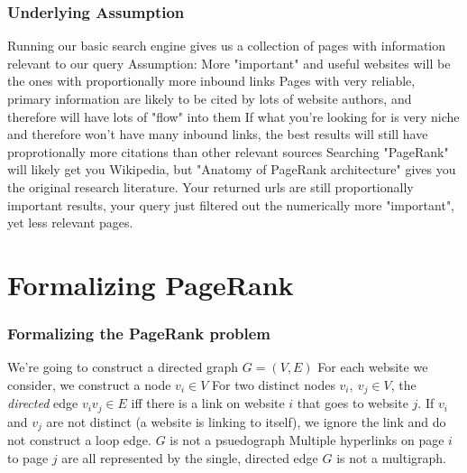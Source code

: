 \documentclass{beamer}
\begin{document}
\begin{frame}[t]
\frametitle{Underlying Assumption}    
\begin{outline}
    \1 Running our basic search engine gives us a collection of pages with information relevant to our query
    \1 Assumption: More "important" and useful websites will be the ones with proportionally more inbound links
    \1 Pages with very reliable, primary information are likely to be cited by lots of website authors, and therefore will have lots of "flow" into them
    \1 If what you're looking for is very niche and therefore won't have many inbound links, the best results will still have proprotionally more citations than other relevant sources
    \1 Searching "PageRank" will likely get you Wikipedia, but "Anatomy of PageRank architecture" gives you the original research literature. Your returned urls are still proportionally important results, your query just filtered out the numerically more "important", yet less relevant pages.
\end{outline}
\end{frame}

\section{Formalizing PageRank}
\begin{frame}[t]
\frametitle{Formalizing the PageRank problem}
\begin{outline}
    \1 We're going to construct a directed graph $G = (V, E)$
    \1 For each website we consider, we construct a node $v_i \in V$
    \1 For two distinct nodes $v_i,\ v_j \in V$, the \emph{directed} edge $v_iv_j \in E$ iff there is a link on website $i$ that goes to website $j$.
    \1 If $v_i$ and $v_j$ are not distinct (a website is linking to itself), we ignore the link and do not construct a loop edge.
        \2 $G$ is not a psuedograph
    \1 Multiple hyperlinks on page $i$ to page $j$ are all represented by the single, directed edge 
        \2 $G$ is not a multigraph.
\end{outline}
\end{frame}
\end{document}
